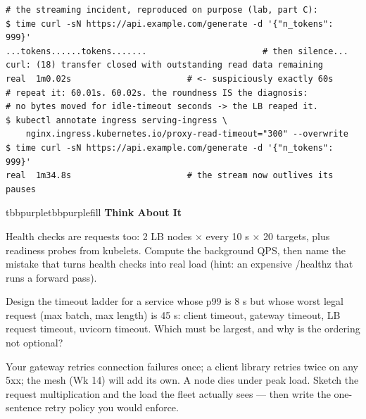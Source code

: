 \begin{terminalbox}
\begin{Verbatim}[breaklines=true,breakanywhere=true,fontsize=\small,formatcom=\color{tbbtermfg},codes=\tbbcodeactive]
# the streaming incident, reproduced on purpose (lab, part C):
$ time curl -sN https://api.example.com/generate -d '{"n_tokens": 999}'
...tokens......tokens.......                       # then silence...
curl: (18) transfer closed with outstanding read data remaining
real  1m0.02s                       # <- suspiciously exactly 60s
# repeat it: 60.01s. 60.02s. the roundness IS the diagnosis:
# no bytes moved for idle-timeout seconds -> the LB reaped it.
$ kubectl annotate ingress serving-ingress \
    nginx.ingress.kubernetes.io/proxy-read-timeout="300" --overwrite
$ time curl -sN https://api.example.com/generate -d '{"n_tokens": 999}'
real  1m34.8s                       # the stream now outlives its pauses
\end{Verbatim}
\end{terminalbox}

\begin{calloutbox}{tbbpurple}{tbbpurplefill}
{\normalsize\bfseries\color{tbbpurple}Think About It}\par\vspace{3pt}
\begin{tbbitemize}
  \item Health checks are requests too: 2 LB nodes × every 10 s × 20 targets, plus readiness probes from kubelets. Compute the background QPS, then name the mistake that turns health checks into real load (hint: an expensive /healthz that runs a forward pass).
  \item Design the timeout ladder for a service whose p99 is 8 s but whose worst legal request (max batch, max length) is 45 s: client timeout, gateway timeout, LB request timeout, uvicorn timeout. Which must be largest, and why is the ordering not optional?
  \item Your gateway retries connection failures once; a client library retries twice on any 5xx; the mesh (Wk 14) will add its own. A node dies under peak load. Sketch the request multiplication and the load the fleet actually sees — then write the one-sentence retry policy you would enforce.
\end{tbbitemize}
\end{calloutbox}

